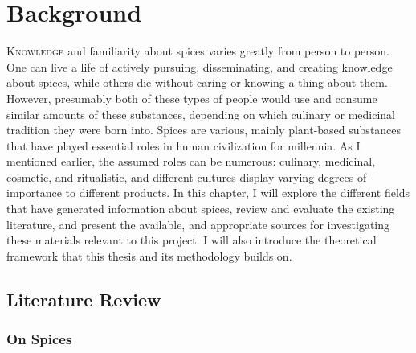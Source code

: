 \chapter{Background}
\label{ch:background}


\lettrine[lines=\iniciale]{\textcolor{\accentcolor}{K}}{nowledge} and familiarity about spices varies greatly from person to person. One can live a life of actively pursuing, disseminating, and creating knowledge about spices, while others die without caring or knowing a thing about them. However, presumably both of these types of people would use and consume similar amounts of these substances, depending on which culinary or medicinal tradition they were born into. Spices are various, mainly plant-based substances that have played essential roles in human civilization for millennia. As I mentioned earlier, the assumed roles can be numerous: culinary, medicinal, cosmetic, and ritualistic, and different cultures display varying degrees of importance to different products. 
In this chapter, I will explore the different fields that have generated information about spices, review and evaluate the existing literature, and present the available, and appropriate sources for investigating these materials relevant to this project. I will also introduce the theoretical framework that this thesis and its methodology builds on.

\section{Literature Review}

\subsection{On Spices}

